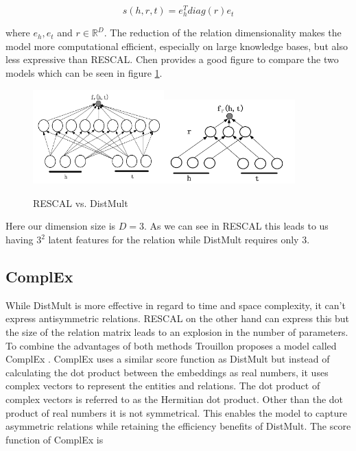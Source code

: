 \begin{equation}
\label{eq:distmult_score}
s(h,r,t)=e_h^T diag(r) e_t
\end{equation}

where $e_h, e_t$ and $r\in \mathbb{R}^D$. The reduction of the relation dimensionality makes the model more computational efficient, especially on large knowledge bases, but also less expressive than RESCAL. Chen \cite{chen_knowledge_2020} provides a good figure to compare the two models which can be seen in figure \ref{fig:rescal_distmult}.

\begin{figure}[H]
\centering
\includegraphics[width=0.45\textwidth]{images/rescal.png}\includegraphics[width=0.45\textwidth]{images/distmult.png}
\caption{RESCAL vs. DistMult}
\label{fig:rescal_distmult}
\end{figure}

Here our dimension size is $D=3$. As we can see in RESCAL this leads to us having $3^2$ latent features for the relation while DistMult requires only $3$.

\subsection{ComplEx}
\label{cha:complex}
While DistMult is more effective in regard to time and space complexity, it can't express antisymmetric relations. RESCAL on the other hand can express this but the size of the relation matrix leads to an explosion in the number of parameters. 
To combine the advantages of both methods Trouillon proposes a model called ComplEx  \cite{trouillon_complex_2016}. ComplEx uses a similar score function as DistMult but instead of calculating the dot product between the embeddings as real numbers, it uses complex vectors to represent the entities and relations. The dot product of complex vectors is referred to as the Hermitian dot product. Other than the dot product of real numbers it is not symmetrical. This enables the model to capture asymmetric relations while retaining the efficiency benefits of DistMult. The score function of ComplEx is 


